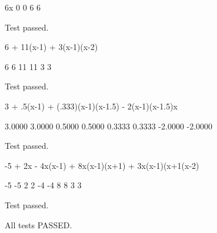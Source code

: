  6x
 0     0
 6     6

 Test passed.

 6 + 11(x-1) + 3(x-1)(x-2)

 6     6
 11    11
 3     3

 Test passed.

 3 + .5(x-1) + (.333)(x-1)(x-1.5) - 2(x-1)(x-1.5)x

 3.0000    3.0000
 0.5000    0.5000
 0.3333    0.3333
 -2.0000   -2.0000

 Test passed.

 -5 + 2x - 4x(x-1) + 8x(x-1)(x+1) + 3x(x-1)(x+1(x-2)

 -5    -5
 2     2
 -4    -4
 8     8
 3     3

 Test passed.

 All tests PASSED.

